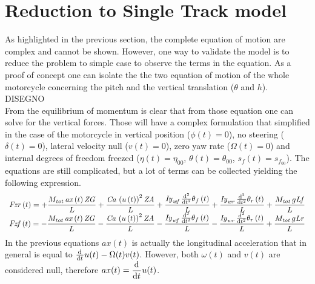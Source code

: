 \section{Reduction to Single Track model}
%
As highlighted in the previous section, the complete equation of motion are complex and cannot be shown. However, one way to validate the model is to reduce the problem to simple case to observe the terms in the equation. As a proof of concept one can isolate the the two equation of motion of the whole motorcycle concerning the pitch and the vertical translation ($\theta$ and $h$).\\
%
DISEGNO\\
%
From the equilibrium of momentum is clear that from those equation one can solve for the vertical forces. Those will have a complex formulation that simplified in the case of the motorcycle in vertical position ($\phi(t)=0$), no steering ($\delta(t)=0$), lateral velocity null ($v(t)=0$), zero yaw rate ($\Omega(t)=0$) and internal degrees of freedom freezed ($\eta(t)=\eta_00$, $\theta(t) = \theta_00$, $s_f(t)=s_{f_{00}}$). The equations are still complicated, but a lot of terms can be collected yielding the following expression.
%
\begin{equation}
    \label{eq:vertForces}
\begin{array}{c} 
\displaystyle
{\it Fzr} \left( t \right) =+{\frac {M_{{\it tot}}\,{\it ax} \left( t \right) {\it ZG}}{L}}+{\frac {{\it Ca}\,\left( u \left( t \right)  \right) ^{2}{\it ZA}}{L}}+{\frac {{\it Iy}_{{\it wf}}\,{\frac {{\rm d}^{2}}{{\rm d}{t}^{2}}}\theta_{f} \left( t \right) }{L}}+{\frac {{\it Iy}_{{\it wr}}\,{\frac {{\rm d}^{2}}{{\rm d}{t}^{2}}}\theta_{r} \left( t \right) }{L}}+{\frac {M_{{\it tot}}\,g{\it Lf}}{L}}\\
\displaystyle
{\it Fzf} \left( t \right) =-{\frac {M_{{\it tot}}\,{\it ax} \left( t \right) {\it ZG}}{L}}-{\frac {{\it Ca}\, \left( u \left( t \right)  \right) ^{2}{\it ZA}}{L}}-{\frac {{\it Iy}_{{\it wf}}\,{\frac {{\rm d}^{2}}{{\rm d}{t}^{2}}}\theta_{f} \left( t \right) }{L}}-{\frac {{\it Iy}_{{\it wr}}\,{\frac {{\rm d}^{2}}{{\rm d}{t}^{2}}}\theta_{r} \left( t \right) }{L}}+{\frac {M_{{\it tot}}\,g{\it Lr}}{L}}
\end{array}    
\end{equation}
%
In the previous equations $ax(t)$ is actually the longitudinal acceleration that in general is equal to $\frac {{\rm d}^{}}{{\rm d}{t}^{}}u(t)-\Omega(t) v(t)$. However, both $\omega(t)$ and $v(t)$ are considered null, therefore $\displaystyle ax(t) = \frac {{\rm d}^{}}{{\rm d}{t}^{}}u(t)$.
